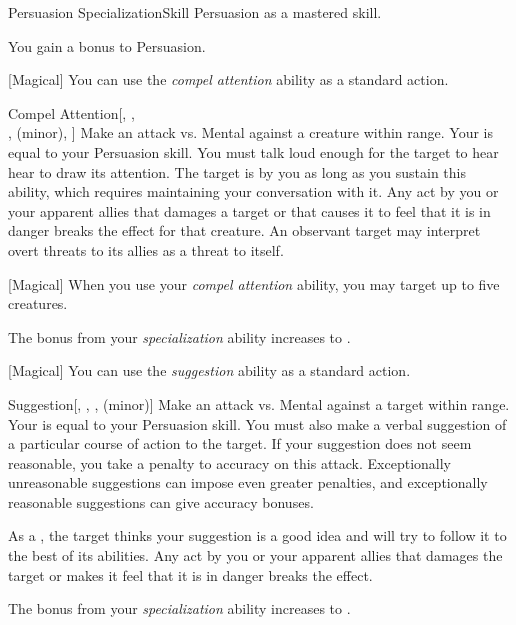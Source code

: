     \begin{feat}{Persuasion Specialization}{Skill}
        \featpre Persuasion as a mastered skill.

         You gain a  bonus to Persuasion.

        [Magical] You can use the \textit{compel attention} ability as a standard action.
        \begin{apability}{Compel Attention}[, ,\\,  (minor), ]
            Make an attack vs. Mental against a creature within \rngmed range.
            Your  is equal to your Persuasion skill.
            You must talk loud enough for the target to hear hear to draw its attention.
            \hit The target is  by you as long as you sustain this ability, which requires maintaining your conversation with it.
            Any act by you or your apparent allies that damages a target or that causes it to feel that it is in danger breaks the effect for that creature.
            An observant target may interpret overt threats to its allies as a threat to itself.
        \end{apability}

        [Magical] When you use your \textit{compel attention} ability, you may target up to five creatures.

         The bonus from your \textit{specialization} ability increases to .

        [Magical] You can use the \textit{suggestion} ability as a standard action.
        \begin{apability}{Suggestion}[, , ,  (minor)]
            Make an attack vs. Mental against a target within \rngmed range.
            Your  is equal to your Persuasion skill.
            You must also make a verbal suggestion of a particular course of action to the target.
            If your suggestion does not seem reasonable, you take a  penalty to accuracy on this attack.
            Exceptionally unreasonable suggestions can impose even greater penalties, and exceptionally reasonable suggestions can give accuracy bonuses.

            \hit As a , the target thinks your suggestion is a good idea and will try to follow it to the best of its abilities.
            Any act by you or your apparent allies that damages the target or makes it feel that it is in danger breaks the effect.

        \end{apability}

         The bonus from your \textit{specialization} ability increases to .
    \end{feat}


